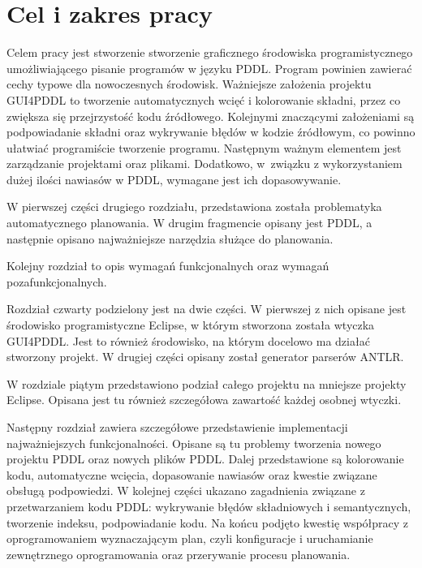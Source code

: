 \section{Cel i zakres pracy}
Celem pracy jest stworzenie stworzenie graficznego środowiska programistycznego umożliwiającego pisanie programów w języku PDDL.  Program powinien zawierać cechy typowe dla nowoczesnych środowisk. Ważniejsze założenia projektu GUI4PDDL to tworzenie automatycznych wcięć i kolorowanie składni, przez co zwiększa się przejrzystość kodu źródłowego. Kolejnymi znaczącymi założeniami są podpowiadanie składni oraz wykrywanie błędów w kodzie źródłowym, co powinno ułatwiać programiście tworzenie programu. Następnym ważnym elementem jest zarządzanie projektami oraz plikami. Dodatkowo, w~związku z wykorzystaniem dużej ilości nawiasów w PDDL, wymagane jest ich dopasowywanie. 

W pierwszej części drugiego rozdziału, przedstawiona została problematyka automatycznego planowania. W drugim fragmencie opisany jest  PDDL, a następnie opisano najważniejsze narzędzia służące do planowania.

Kolejny rozdział to opis wymagań funkcjonalnych oraz wymagań pozafunkcjonalnych.

Rozdział czwarty podzielony jest na dwie części. W pierwszej z nich opisane jest środowisko programistyczne Eclipse, w którym stworzona została wtyczka GUI4PDDL. Jest to również środowisko, na którym docelowo ma działać stworzony projekt. W drugiej części opisany został generator parserów ANTLR.

W rozdziale piątym przedstawiono podział całego projektu na mniejsze projekty Eclipse. Opisana jest tu również szczegółowa zawartość każdej osobnej wtyczki.

Następny rozdział zawiera szczegółowe przedstawienie implementacji najważniejszych funkcjonalności. Opisane są tu problemy tworzenia nowego projektu PDDL oraz nowych plików PDDL. Dalej przedstawione są kolorowanie kodu, automatyczne wcięcia, dopasowanie nawiasów oraz kwestie związane obsługą podpowiedzi. W kolejnej części ukazano zagadnienia związane z przetwarzaniem kodu PDDL: wykrywanie błędów składniowych i semantycznych, tworzenie indeksu, podpowiadanie kodu. Na końcu podjęto kwestię współpracy z oprogramowaniem wyznaczającym plan, czyli konfiguracje i uruchamianie zewnętrznego oprogramowania oraz przerywanie procesu planowania.

